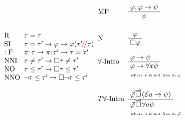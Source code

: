 \documentclass[xcolor=x11names]{beamer}
\newcommand{\bemph}[1] {{\color{DeepSkyBlue3}{#1}}}
\newcommand{\cemph}[1]{\textcolor{red}{#1}}
\newcommand{\lrule}[3][c]{\begin{array}{#1} #2  \\  \hline #3 \end{array}}
\newcommand{\lthen}{\rightarrow}
\newcommand{\points}[1][0]{\hspace{#1ex}\hspace{-.5ex}:\hspace{-.5ex}\hspace{#1ex}}
\newcommand{\BoxTemplate}[1]{{#1} \overrightarrow {\Box}}
\newenvironment{tomb}[2][.1]{\arraycolsep=#1cm\begin{array}{#2}}{\end{array}}
\begin{document}
\begin{frame}[t]
\[\begin{tomb}[.1]{ll}
\\      \mathrm{R}  & \tau=\tau
\\      \mathrm{SI} & \tau=\tau' \lthen \varphi \lthen \varphi (\tau'\cemph{\!/\!/} \tau )
\\      \mathrm{:F} & \pi \points \tau \lthen \pi \points\tau' \lthen \tau=\tau'
\\      \mathrm{NNI}  & \tau\neq\tau' \lthen \Box \tau\neq\tau'
\\      \mathrm{NO}  & \tau\leq\tau' \lthen \Box \tau\leq\tau'
\\      \mathrm{NNO}  & \lnot \tau\leq\tau' \lthen \Box \lnot \tau\leq\tau'
\end{tomb}
\begin{tomb}[.1]{ll}

\\[1em]\mathrm{MP} &  \lrule[c]{\varphi , \varphi \lthen \psi}{\psi}
\\[2em] \mathrm{N}  & \lrule[c]{\varphi}{\Box \varphi}
\\[1.5em] \forall\textup{-Intro}  & \lrule[l]{\varphi \lthen \psi}{\varphi \lthen \forall x \psi }
\\ &\hfill \textup{ \tiny where $x$ is not free in $\varphi$}
\\[1.5em] T\forall\textup{-Intro}  & \lrule[l]{ \BoxTemplate{\vec\varphi } (\mathcal E a\lthen \psi)}{\BoxTemplate{\vec\varphi }\forall a \psi }
\\ &\hfill \textup{ \tiny where $a$ is not free in $\vec \varphi$}
\end{tomb}\]
\end{frame}
\end{document}
